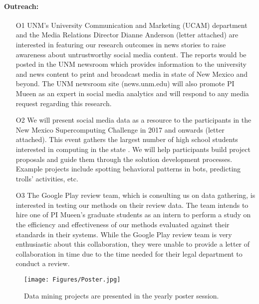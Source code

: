 \paragraph{Outreach:}  
\vspace{-0.1cm}
\begin{itemize}[noitemsep,leftmargin=*]
\vspace{-0.2cm}
\item [O1] UNM's University Communication and Marketing (UCAM) department and the Media Relations Director Dianne Anderson (letter attached) are interested in featuring our research outcomes in news stories to raise awareness about untrustworthy social media content. The reports would be posted in the UNM newsroom which provides information to the university and news content to print and broadcast media in state of New Mexico and beyond. The UNM newsroom site (news.unm.edu) will also promote PI Mueen as an expert in social media analytics and will respond to any media request regarding this research.

\item [O2] We will present social media data as a resource to the participants in the New Mexico Supercomputing Challenge in 2017 and onwards (letter attached). This event gathers the largest number of high school students interested in computing in the state \cite{NMSC}. We will help participants build project proposals and guide them through the solution development processes. Example projects include spotting behavioral patterns in bots, predicting trolls' activities, etc.


\item [O3] The Google Play review team, which is consulting us on data gathering, is interested in testing our methods on their review data. The team intends to hire one of PI Mueen's graduate students as an intern to perform a study on the efficiency and effectiveness of our methods evaluated against their standards in their systems. While the Google Play review team is very enthusiastic about this collaboration, they were unable to provide a letter of collaboration in time due to the time needed for their legal department to conduct a review. 
\end{itemize}
\begin{wrapfigure}{r}{0.3\textwidth}
\vspace{-1.5cm}
\begin{center}
\texttt{[image: Figures/Poster.jpg]}
\caption{Data mining projects are presented in the yearly poster session.}
\label{fig:Outreach}
\end{center}
\vspace{-0.5cm}
\end{wrapfigure}
